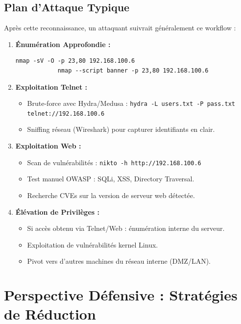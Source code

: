 \documentclass[12pt,a4paper,openany]{report}
\begin{document}
	\subsection{Plan d'Attaque Typique}
	Après cette reconnaissance, un attaquant suivrait généralement ce workflow :
	
	\begin{enumerate}
		\item \textbf{Énumération Approfondie :}
		\begin{lstlisting}[caption=Détection de version et OS]
			nmap -sV -O -p 23,80 192.168.100.6
			nmap --script banner -p 23,80 192.168.100.6
		\end{lstlisting}
		
		\item \textbf{Exploitation Telnet :}
		\begin{itemize}
			\item Brute-force avec Hydra/Medusa : \texttt{hydra -L users.txt -P pass.txt telnet://192.168.100.6}
			\item Sniffing réseau (Wireshark) pour capturer identifiants en clair.
		\end{itemize}
		
		\item \textbf{Exploitation Web :}
		\begin{itemize}
			\item Scan de vulnérabilités : \texttt{nikto -h http://192.168.100.6}
			\item Test manuel OWASP : SQLi, XSS, Directory Traversal.
			\item Recherche CVEs sur la version de serveur web détectée.
		\end{itemize}
		
		\item \textbf{Élévation de Privilèges :}
		\begin{itemize}
			\item Si accès obtenu via Telnet/Web : énumération interne du serveur.
			\item Exploitation de vulnérabilités kernel Linux.
			\item Pivot vers d'autres machines du réseau interne (DMZ/LAN).
		\end{itemize}
	\end{enumerate}
	
	\section{Perspective Défensive : Stratégies de Réduction}
	
\end{document}

